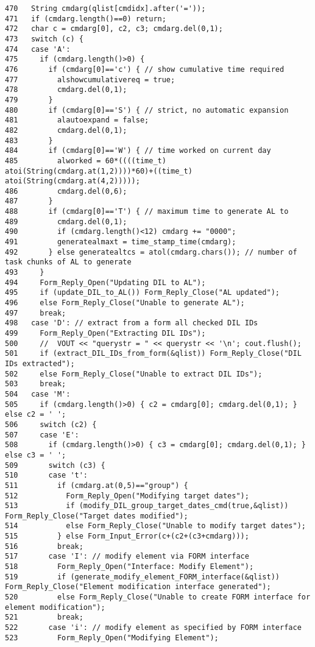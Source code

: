 \begin{verbatim}
470   String cmdarg(qlist[cmdidx].after('='));
471   if (cmdarg.length()==0) return;
472   char c = cmdarg[0], c2, c3; cmdarg.del(0,1);
473   switch (c) {
474   case 'A':
475     if (cmdarg.length()>0) {
476       if (cmdarg[0]=='c') { // show cumulative time required
477         alshowcumulativereq = true;
478         cmdarg.del(0,1);
479       }
480       if (cmdarg[0]=='S') { // strict, no automatic expansion
481         alautoexpand = false;
482         cmdarg.del(0,1);
483       }
484       if (cmdarg[0]=='W') { // time worked on current day
485         alworked = 60*((((time_t) atoi(String(cmdarg.at(1,2))))*60)+((time_t) atoi(String(cmdarg.at(4,2)))));
486         cmdarg.del(0,6);
487       }
488       if (cmdarg[0]=='T') { // maximum time to generate AL to
489         cmdarg.del(0,1);
490         if (cmdarg.length()<12) cmdarg += "0000";
491         generatealmaxt = time_stamp_time(cmdarg);
492       } else generatealtcs = atol(cmdarg.chars()); // number of task chunks of AL to generate
493     }
494     Form_Reply_Open("Updating DIL to AL");
495     if (update_DIL_to_AL()) Form_Reply_Close("AL updated");
496     else Form_Reply_Close("Unable to generate AL");
497     break;
498   case 'D': // extract from a form all checked DIL IDs
499     Form_Reply_Open("Extracting DIL IDs");
500     //  VOUT << "querystr = " << querystr << '\n'; cout.flush();
501     if (extract_DIL_IDs_from_form(&qlist)) Form_Reply_Close("DIL IDs extracted");
502     else Form_Reply_Close("Unable to extract DIL IDs");
503     break;
504   case 'M':
505     if (cmdarg.length()>0) { c2 = cmdarg[0]; cmdarg.del(0,1); } else c2 = ' ';
506     switch (c2) {
507     case 'E':
508       if (cmdarg.length()>0) { c3 = cmdarg[0]; cmdarg.del(0,1); } else c3 = ' ';
509       switch (c3) {
510       case 't':
511         if (cmdarg.at(0,5)=="group") {
512           Form_Reply_Open("Modifying target dates");
513           if (modify_DIL_group_target_dates_cmd(true,&qlist)) Form_Reply_Close("Target dates modified");
514           else Form_Reply_Close("Unable to modify target dates");
515         } else Form_Input_Error(c+(c2+(c3+cmdarg)));
516         break;
517       case 'I': // modify element via FORM interface
518         Form_Reply_Open("Interface: Modify Element");
519         if (generate_modify_element_FORM_interface(&qlist)) Form_Reply_Close("Element modification interface generated");
520         else Form_Reply_Close("Unable to create FORM interface for element modification");
521         break;
522       case 'i': // modify element as specified by FORM interface
523         Form_Reply_Open("Modifying Element");

\end{verbatim}
